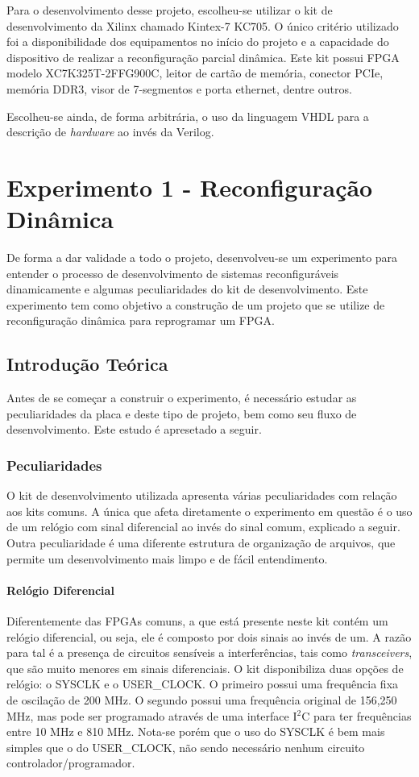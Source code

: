 \documentclass[11pt,a4paper,oneside]{book}
\begin{document}
Para o desenvolvimento desse projeto, escolheu-se utilizar o kit de desenvolvimento da Xilinx\textregistered{} chamado Kintex-7 KC705.
O único critério utilizado foi a disponibilidade dos equipamentos no início do projeto e a capacidade do dispositivo de realizar a reconfiguração parcial dinâmica.
Este kit possui FPGA modelo XC7K325T-2FFG900C, leitor de cartão de memória, conector PCIe\textregistered{}, memória DDR3, visor de 7-segmentos e porta ethernet, dentre outros.

Escolheu-se ainda, de forma arbitrária, o uso da linguagem VHDL para a descrição de \textit{hardware} ao invés da Verilog.

\chapter{Experimento 1 - Reconfiguração Dinâmica}
De forma a dar validade a todo o projeto, desenvolveu-se um experimento para entender o processo de desenvolvimento de sistemas reconfiguráveis dinamicamente e algumas peculiaridades do kit de desenvolvimento.
Este experimento tem como objetivo a construção de um projeto que se utilize de reconfiguração dinâmica para reprogramar um FPGA.

\section{Introdução Teórica}
Antes de se começar a construir o experimento, é necessário estudar as peculiaridades da placa e deste tipo de projeto, bem como seu fluxo de desenvolvimento.
Este estudo é apresetado a seguir.

\subsection{Peculiaridades}
O kit de desenvolvimento utilizada apresenta várias peculiaridades com relação aos kits comuns.
A única que afeta diretamente o experimento em questão é o uso de um relógio com sinal diferencial ao invés do sinal comum, explicado a seguir.
Outra peculiaridade é uma diferente estrutura de organização de arquivos, que permite um desenvolvimento mais limpo e de fácil entendimento.

\subsubsection{Relógio Diferencial}
Diferentemente das FPGAs comuns, a que está presente neste kit contém um relógio diferencial, ou seja, ele é composto por dois sinais ao invés de um.
A razão para tal é a presença de circuitos sensíveis a interferências, tais como \textit{transceivers}, que são muito menores em sinais diferenciais.
O kit disponibiliza duas opções de relógio: o SYSCLK e o USER\_CLOCK.
O primeiro possui uma frequência fixa de oscilação de 200 MHz.
O segundo possui uma frequência original de 156,250 MHz, mas pode ser programado através de uma interface I$^2$C para ter frequências entre 10 MHz e 810 MHz.
Nota-se porém que o uso do SYSCLK é bem mais simples que o do USER\_CLOCK, não sendo necessário nenhum circuito controlador/programador.
\end{document}
